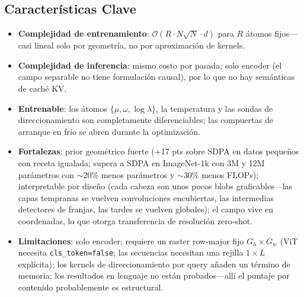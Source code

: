 \subsection{Características Clave}
\begin{itemize}[leftmargin=*]
    \item \textbf{Complejidad de entrenamiento}: $\mathcal{O}(R \cdot N \sqrt{N} \cdot d)$ para $R$ átomos fijos---casi lineal solo por geometría, no por aproximación de kernels.
    \item \textbf{Complejidad de inferencia}: mismo costo por pasada; solo encoder (el campo separable no tiene formulación causal), por lo que no hay semánticas de caché KV.
    \item \textbf{Entrenable}: los átomos $\{\mu, \omega, \log\lambda\}$, la temperatura y las sondas de direccionamiento son completamente diferenciables; las compuertas de arranque en frío se abren durante la optimización.
    \item \textbf{Fortalezas}: prior geométrico fuerte (+17 pts sobre SDPA en datos pequeños con receta igualada; supera a SDPA en ImageNet-1k con 3M y 12M parámetros con $\sim$20\% menos parámetros y $\sim$30\% menos FLOPs); interpretable por diseño (cada cabeza son unos pocos blobs graficables---las capas tempranas se vuelven convoluciones encubiertas, las intermedias detectores de franjas, las tardes se vuelven globales); el campo vive en coordenadas, lo que otorga transferencia de resolución zero-shot.
    \item \textbf{Limitaciones}: solo encoder; requiere un raster row-major fijo $G_h \times G_w$ (ViT necesita \texttt{cls\_token=false}; las secuencias necesitan una rejilla $1 \times L$ explícita); los kernels de direccionamiento por query añaden un término de memoria; los resultados en lenguaje no están probados---allí el puntaje por contenido probablemente es estructural.
\end{itemize}
